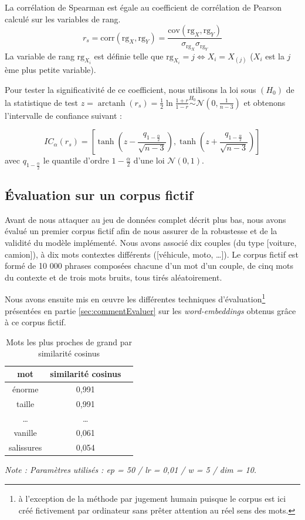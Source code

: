 \documentclass[11pt,french,french]{article}
\let\rmarkdownfootnote\footnote%
\def\footnote{\protect\rmarkdownfootnote}
\DeclareMathOperator{\arctanh}{arctanh}
\begin{document}
La corrélation de Spearman est égale au coefficient de corrélation de
Pearson calculé sur les variables de rang. \[
r_s = \mathrm{corr}(\mathrm{rg}_X, \mathrm{rg}_Y) = 
\frac{\mathrm{cov}(\mathrm{rg}_X, \mathrm{rg}_Y)}{
\sigma_{\mathrm{rg}_X} \sigma_{\mathrm{rg}_Y}
}
\] La variable de rang \(\mathrm{rg}_{X_i}\) est définie telle que
\(\mathrm{rg}_{X_i}=j \iff X_i = X_{(j)}\) (\(X_i\) est la \(j\)ème plus
petite variable).

Pour tester la significativité de ce coefficient, nous utilisons la loi
sous \((H_0)\) de la statistique de test
\(z = \arctanh(r_s) = \frac{1}{2} \ln\frac{1+r}{1-r} \overset{H_0}{\sim}\mathcal{N}(0, \frac{1}{n-3})\)
et obtenons l'intervalle de confiance suivant :

\[
IC_\alpha (r_s) = \left[\tanh\left(z-\frac{q_{1-\frac{\alpha}{2}}}{\sqrt{n-3}}\right),
\tanh\left(z+\frac{q_{1-\frac{\alpha}{2}}}{\sqrt{n-3}}\right)\right]
\] avec \(q_{1-\frac{\alpha}{2}}\) le quantile d'ordre
\(1-\frac{\alpha}{2}\) d'une loi \(\mathcal{N}(0, 1)\).

\subsection{Évaluation sur un corpus fictif}\label{sec:corpusFictif}

Avant de nous attaquer au jeu de données complet décrit plus bas, nous
avons évalué un premier corpus fictif afin de nous assurer de la
robustesse et de la validité du modèle implémenté. Nous avons associé
dix couples (du type {[}voiture, camion{]}), à dix mots contextes
différents ({[}véhicule, moto, \dots{]}). Le corpus fictif est formé de
10 000 phrases composées chacune d'un mot d'un couple, de cinq mots du
contexte et de trois mots bruits, tous tirés aléatoirement.

Nous avons ensuite mis en œuvre les différentes techniques
d'évaluation\footnote{à l'exception de la méthode par \og jugement
  humain \fg{} puisque le corpus est ici créé fictivement par ordinateur
  sans prêter attention au réel sens des mots.} présentées en partie
\ref{sec:commentEvaluer} sur les \emph{word-embeddings} obtenus grâce à
ce corpus fictif.

\begin{table}
\begin{center}
\begin{tabular}{|c|c|c|}
    \hline
    mot & similarité cosinus \tabularnewline
    \hline
    énorme & 0,991   \tabularnewline
    taille & 0,991   \tabularnewline
    \dots & \dots    \tabularnewline
    vanille & 0,061   \tabularnewline
    salissures & 0,054   \tabularnewline
    \hline
 \end{tabular}
\captionsetup{margin=0cm,format=hang,justification=justified}
\caption{Mots les plus proches de \og grand \fg{} par similarité cosinus}\label{table:tableau_evaluation}
\end{center}
\vspace{-0.3cm}
\footnotesize
\emph{Note : Paramètres utilisés : ep = 50 / lr = 0,01 / w = 5 / dim = 10.}
\end{table}
\end{document}
